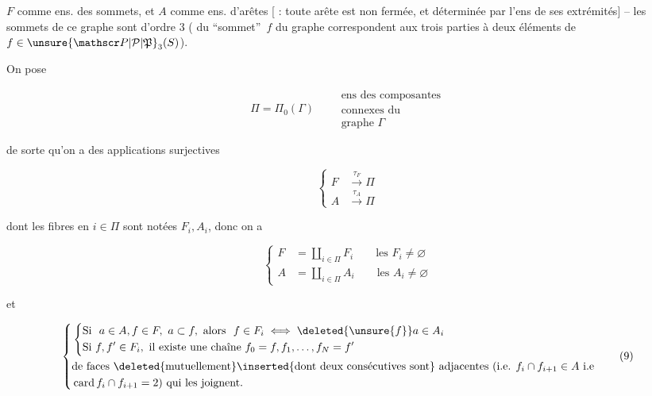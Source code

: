 
$F$ comme ens. des sommets, et $A$ comme ens. d'arêtes [ : toute arête est non fermée, et déterminée par l'ens de ses extrémités] --  les sommets de ce graphe sont d'ordre $3$ ( du ``sommet''\ $f$ du graphe correspondent aux trois parties à deux éléments de $f\in\unsure{\mathscr P|\mathcal P|\mathfrak P}_3(S)$).

On pose

\[
\Pi=\Pi_0(\Gamma)\qquad\substack{\text{ens des composantes}\\\text{connexes du}\\\text{graphe }\Gamma}\tag*{(6)}
\]

 de sorte qu'on a des applications surjectives

\[
\left\{\begin{aligned}
 F&\xrightarrow{\tau_F}\Pi\\
 A&\xrightarrow{\tau_A}\Pi
\end{aligned}\right.\tag*{(7)}
\]

dont les fibres en $i\in\Pi$ sont notées $F_i,A_i$, donc on a

\[
\left\{\begin{aligned}
 F&=\coprod_{i\in\Pi}F_i\qquad\text{les }F_i\ne\varnothing\\
 A&=\coprod_{i\in\Pi}A_i\qquad\text{les }A_i\ne\varnothing
\end{aligned}\right.\tag*{(8)}
\]

et

\[
\left\{\begin{aligned}
 &\left\{\begin{aligned}
 &\text{Si }\ a\in A,f\in F,\ a\subset f,\ \text{alors }\ f\in F_i\iff \deleted{\unsure{f}}a\in A_i\\
 &\text{Si }f,f'\in F_i,\ \text{il existe une chaîne }f_0=f,f_1,\ldots,f_N=f'
 \end{aligned}\right.\\
 &\text{de faces \deleted{mutuellement}\inserted{dont deux consécutives sont} adjacentes (i.e. }f_i\cap f_{i+1}\in A\text{ i.e}\\
 &\operatorname{card} f_i\cap f_{i+1}=2\text{) qui les joignent.}
\end{aligned}\right.\tag*{(9)}
\]
